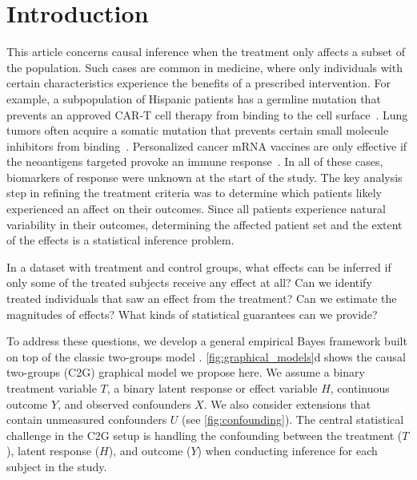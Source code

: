 \section{Introduction}
\label{sec:introduction}

%


%

%
%

This article concerns causal inference when the treatment only affects a subset of the population. 
%
Such cases are common in medicine, where only individuals with certain characteristics experience the benefits of a prescribed intervention.
For example, a subpopulation of Hispanic patients has a germline mutation that prevents an approved CAR-T cell therapy from binding to the cell surface~\citep{seipel:etal:2023:snp-cd19-car-t-escape}. Lung tumors often acquire a somatic mutation that prevents certain small molecule inhibitors from binding~\citep{da:etal:2011:egfr-lung-cancer}. Personalized cancer mRNA vaccines are only effective if the neoantigens targeted provoke an immune response~\citep{rojas:etal:2023:personalized-mrna-pdac}. In all of these cases, biomarkers of response were unknown at the start of the study.
%
The key analysis step in refining the treatment criteria was to determine which patients likely experienced an affect on their outcomes. Since all patients experience natural variability in their outcomes, determining the affected patient set and the extent of the effects is a statistical inference problem.

In a dataset with treatment and control groups, what effects can be inferred if only some of the treated subjects receive any effect at all?
Can we identify treated individuals that saw an effect from the treatment?
Can we estimate the magnitudes of effects? What kinds of statistical guarantees can we provide?

To address these questions, we develop a general empirical Bayes framework built on top of the classic two-groups model \citep{efron:2008}. \cref{fig:graphical_models}d shows the causal two-groups (C2G) graphical model we propose here. We assume a binary treatment variable $T$, a binary latent response or effect variable $H$, continuous outcome $Y$, and observed confounders $X$. We also consider extensions that contain unmeasured confounders $U$ (see \cref{fig:confounding}). The central statistical challenge in the C2G setup is handling the confounding between the treatment ($T$), latent response ($H$), and outcome ($Y$) when conducting inference for each subject in the study.

